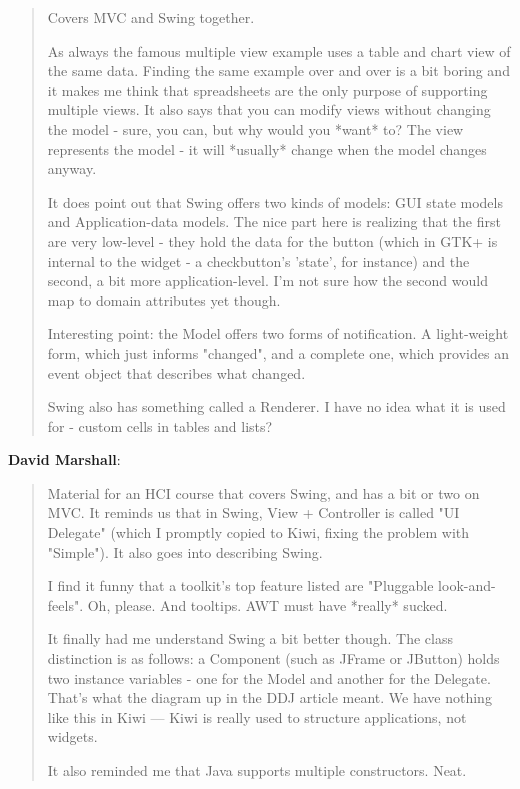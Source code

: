 \documentclass[a4paper]{howto}
\begin{document}
\begin{quotation}

    Covers MVC and Swing together.

    As always the famous multiple view example uses a table and chart
    view of the same data. Finding the same example over and over is a
    bit boring and it makes me think that spreadsheets are the only
    purpose of supporting multiple views.  It also says that you can
    modify views without changing the model - sure, you can, but why
    would you *want* to? The view represents the model - it will
    *usually* change when the model changes anyway.

    It does point out that Swing offers two kinds of models: GUI state
    models and Application-data models. The nice part here is realizing
    that the first are very low-level - they hold the data for the
    button (which in GTK+ is internal to the widget - a checkbutton's
    'state', for instance) and the second, a bit more application-level.
    I'm not sure how the second would map to domain attributes yet
    though.

    Interesting point: the Model offers two forms of notification. A
    light-weight form, which just informs "changed", and a complete one,
    which provides an event object that describes what changed.

    Swing also has something called a Renderer. I have no idea what it
    is used for - custom cells in tables and lists?

\end{quotation}

{\bf David Marshall}:

\begin{quotation}

    Material for an HCI course that covers Swing, and has a bit or two
    on MVC. It reminds us that in Swing, View + Controller is called "UI
    Delegate" (which I promptly copied to Kiwi, fixing the problem with
    "Simple"). It also goes into describing Swing.

    I find it funny that a toolkit's top feature listed are "Pluggable
    look-and-feels". Oh, please. And tooltips. AWT must have *really*
    sucked.

    It finally had me understand Swing a bit better though. The class
    distinction is as follows: a Component (such as JFrame or JButton)
    holds two instance variables - one for the Model and another for the
    Delegate. That's what the diagram up in the DDJ article meant. We
    have nothing like this in Kiwi --- Kiwi is really used to structure
    applications, not widgets.

    It also reminded me that Java supports multiple constructors. Neat.

\end{quotation}
\end{document}
